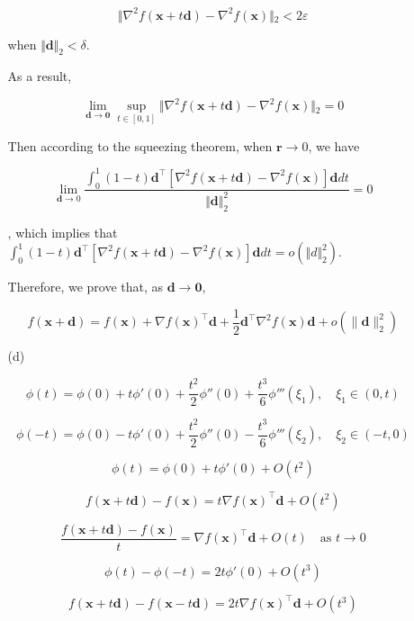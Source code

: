 \documentclass[10pt,a4paper]{article}
\begin{document}
\begin{enumerate}
\begin{enumerate}
        $$
        \Vert{}\nabla^2 f(\mathbf{x} + t\mathbf{d}) - \nabla^2 f(\mathbf{x})\Vert{}_2 < 2\varepsilon
        $$

        when $\Vert \mathbf{d} \Vert_2 < \delta$.

        As a result, 

        $$
        \lim_{\mathbf{d} \to \mathbf{0}} \sup_{t\in[0,1]} \Vert{}\nabla^2 f(\mathbf{x} + t\mathbf{d}) - \nabla^2 f(\mathbf{x})\Vert{}_2 = 0
        $$
        
        Then according to the squeezing theorem, when $\mathbf{r} \rightarrow 0$, we have

        $$
        \lim_{\mathbf{d} \to 0} \frac{\int_0^1 (1 - t) \mathbf{d}^\top \left[ \nabla^2 f(\mathbf{x} + t\mathbf{d}) - \nabla^2 f(\mathbf{x}) \right] \mathbf{d} dt}{\Vert \mathbf{d} \Vert_2^2} = 0
        $$

        , which implies that $\int_0^1 (1 - t) \mathbf{d}^\top \left[ \nabla^2 f(\mathbf{x} + t\mathbf{d}) - \nabla^2 f(\mathbf{x}) \right] \mathbf{d} dt = o(\Vert d \Vert_2^2)$.
        
        Therefore, we prove that, as $\mathbf{d} \to \mathbf{0}$,

        $$
        f(\mathbf{x}+\mathbf{d})
        =
        f(\mathbf{x})+\nabla f(\mathbf{x})^\top\mathbf{d}+\frac12\mathbf{d}^\top\nabla^2 f(\mathbf{x})\mathbf{d}+o(\|\mathbf{d}\|_2^2)
        $$

        \item[(d)]
        
        $$
        \phi(t) = \phi(0) + t\phi'(0) + \frac{t^2}{2}\phi''(0) + \frac{t^3}{6}\phi'''(\xi_1), \quad \xi_1 \in (0, t)
        $$

        $$
        \phi(-t) = \phi(0) - t\phi'(0) + \frac{t^2}{2}\phi''(0) - \frac{t^3}{6}\phi'''(\xi_2), \quad \xi_2 \in (-t, 0)
        $$

        $$
        \phi(t) = \phi(0) + t\phi'(0) + O(t^2)
        $$

        $$
        f(\mathbf{x} + t\mathbf{d}) - f(\mathbf{x}) = t \nabla f(\mathbf{x})^\top \mathbf{d} + O(t^2)
        $$

        $$
        \frac{f(\mathbf{x} + t\mathbf{d}) - f(\mathbf{x})}{t} = \nabla f(\mathbf{x})^\top \mathbf{d} + O(t) \quad \text{as } t \to 0
        $$

        $$
        \phi(t) - \phi(-t) = 2t\phi'(0) + O(t^3)
        $$

        $$
        f(\mathbf{x} + t\mathbf{d}) - f(\mathbf{x} - t\mathbf{d}) = 2t \nabla f(\mathbf{x})^\top \mathbf{d} + O(t^3)
        $$


\end{enumerate}
\end{enumerate}
\end{document}
